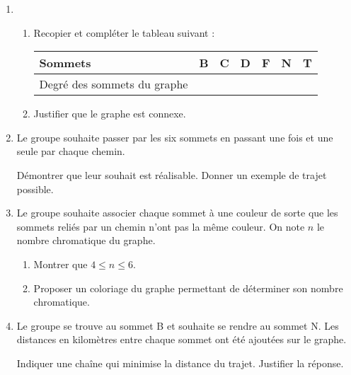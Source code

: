 \begin{enumerate}
     \item
     \begin{enumerate}[label=\alph*.]
          \item
          Recopier et compléter le tableau suivant :
          \begin{tabularx}{0.8\linewidth}{|*{3}{>{\centering \arraybackslash }X|}}%
               \hline
               Sommets  &  B  &  C  &  D  &  F  &  N  &  T
               \\ \hline
               Degré des sommets du graphe  &   &   &   &   &   &
               \\ \hline
          \end{tabularx}
          \item
          Justifier que le graphe est connexe.
     \end{enumerate}
     \item
     Le groupe souhaite passer par les six sommets en passant une fois et une seule par chaque chemin.
     \par
     Démontrer que leur souhait est réalisable. Donner un exemple de trajet possible.
     \item
     Le groupe souhaite associer chaque sommet à une couleur de sorte que les sommets reliés par un chemin n'ont pas la même couleur. On note $n$ le nombre chromatique du graphe.
     \begin{enumerate}[label=\alph*.]
          \item
          Montrer que $4 \leqslant n \leqslant 6$.
          \item
          Proposer un coloriage du graphe permettant de déterminer son nombre chromatique.
     \end{enumerate}
     \item
     Le groupe se trouve au sommet B et souhaite se rendre au sommet N. Les distances en kilomètres entre chaque sommet ont été ajoutées sur le graphe.

\begin{center}
\end{center}

     Indiquer une chaîne qui minimise la distance du trajet. Justifier la réponse.
\end{enumerate}
